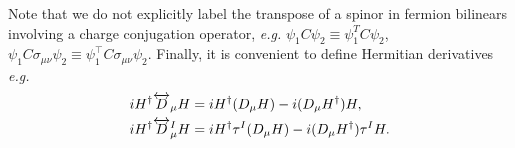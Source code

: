 Note that we do not explicitly label the transpose of a spinor in fermion bilinears involving a charge conjugation operator, \textit{e.g.} $\psi_1 C \psi_2 \equiv \psi_1^T C \psi_2$, $\psi_1 C \sigma_{\mu\nu} \psi_2 \equiv \psi_1^\top C \sigma_{\mu\nu} \psi_2$.
Finally, it is convenient to define Hermitian derivatives \textit{e.g.}
\begin{align}
i H^\dag \overleftrightarrow{D}_\mu H &= i H^\dag (D_\mu H) - i (D_\mu H^\dag) H , \nonumber\\ 
i H^\dag \overleftrightarrow{D}^I_\mu H &= i H^\dag \tau^I (D_\mu H) - i (D_\mu H^\dag) \tau^I H .
\end{align}
